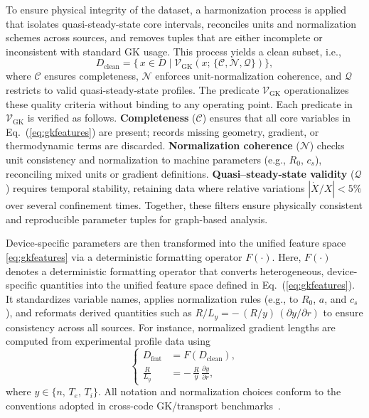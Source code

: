 \documentclass[journal]{IEEEtran}
\begin{document}
To ensure physical integrity of the dataset, a harmonization process is applied that isolates quasi-steady-state core intervals, reconciles units and normalization schemes across sources, and removes tuples that are either incomplete or inconsistent with standard GK usage. This process yields a clean subset, i.e.,
\begin{equation}
D_{\mathrm{clean}}
= \bigl\{\, x \in D \;\big|\;
\mathcal{V}_{\mathrm{GK}}\!\left(x;\,\{\mathcal{C}, \mathcal{N}, \mathcal{Q}\}\right)
\bigr\},
\label{eq:clean}
\end{equation}
where $\mathcal{C}$ ensures completeness, $\mathcal{N}$ enforces unit-normalization coherence, and $\mathcal{Q}$ restricts to valid quasi-steady-state profiles. The predicate $\mathcal{V}_{\mathrm{GK}}$ operationalizes these quality criteria without binding to any operating point. {Each predicate in $\mathcal{V}_{\mathrm{GK}}$ is verified as follows. 
\textbf{Completeness} ($\mathcal{C}$) ensures that all core variables in Eq.~(\ref{eq:gkfeatures}) are present; 
records missing geometry, gradient, or thermodynamic terms are discarded. 
\textbf{Normalization coherence} ($\mathcal{N}$) checks unit consistency and normalization to machine parameters 
(e.g., $R_0$, $c_s$), reconciling mixed units or gradient definitions. 
\textbf{Quasi–steady-state validity} ($\mathcal{Q}$) requires temporal stability, 
retaining data where relative variations $|\dot{X}/X|<5\%$ over several confinement times. 
Together, these filters ensure physically consistent and reproducible parameter tuples for graph-based analysis.
}

Device-specific parameters are then transformed into the unified feature space \eqref{eq:gkfeatures} via a deterministic formatting operator $F(\cdot)$. {Here, $F(\cdot)$ denotes a deterministic formatting operator that converts heterogeneous, device-specific quantities into the unified feature space defined in Eq.~(\ref{eq:gkfeatures}). It standardizes variable names, applies normalization rules (e.g., to $R_0$, $a$, and $c_s$), and reformats derived quantities such as $R/L_y = -\,(R/y)\,(\partial y/\partial r)$ to ensure consistency across all sources.} For instance, normalized gradient lengths are computed from experimental profile data using
\begin{equation}
\left\{
\begin{aligned}
D_{\mathrm{fmt}} &= F\!\left(D_{\mathrm{clean}}\right), \\
\frac{R}{L_y} &= -\,\frac{R}{y}\,\frac{\partial y}{\partial r},
\end{aligned}
\right.
\label{eq:format}
\end{equation}
where $y \in \{n,\,T_e,\,T_i\}$. All notation and normalization choices conform to the conventions adopted in cross-code GK/transport benchmarks~\cite{bourdelle2015core}.
\end{document}
